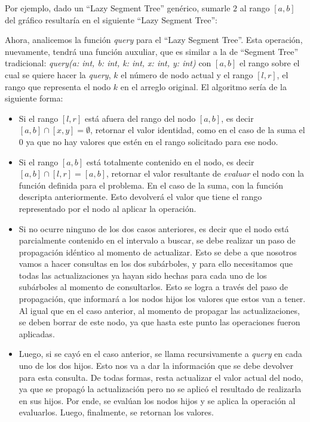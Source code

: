 \documentclass{article}
\begin{document}
Por ejemplo, dado un ``Lazy Segment Tree'' genérico, sumarle $2$ al rango $[a,b]$ del gráfico resultaría en el siguiente ``Lazy Segment Tree'':



Ahora, analicemos la función \textit{query} para el ``Lazy Segment Tree''. Esta operación, nuevamente, tendrá una función auxuliar, que es similar a la de ``Segment Tree'' tradicional: \textit{query(a: int, b: int, k: int, x: int, y: int)} con $[a,b]$ el rango sobre el cual se quiere hacer la \textit{query}, $k$ el número de nodo actual y el rango $[l,r]$, el rango que representa el nodo $k$ en el arreglo original. El algoritmo sería de la siguiente forma:

\begin{itemize}
    \item Si el rango $[l,r]$ está afuera del rango del nodo $[a,b]$, es decir $[a,b]\cap[x,y] = \emptyset$, retornar el valor identidad, como en el caso de la suma el $0$ ya que no hay valores que estén en el rango solicitado para ese nodo.
    \item Si el rango $[a,b]$ está totalmente contenido en el nodo, es decir $[a,b]\cap[l,r] = [a, b]$, retornar el valor resultante de \textit{evaluar} el nodo con la función definida para el problema. En el caso de la suma, con la función descripta anteriormente. Esto devolverá el valor que tiene el rango representado por el nodo al aplicar la operación.
    \item Si no ocurre ninguno de los dos casos anteriores, es decir que el nodo está parcialmente contenido en el intervalo a buscar, se debe realizar un paso de propagación idéntico al momento de actualizar. Esto se debe a que nosotros vamos a hacer consultas en los dos subárboles, y para ello necesitamos que todas las actualizaciones ya hayan sido hechas para cada uno de los subárboles al momento de consultarlos. Esto se logra a través del paso de propagación, que informará a los nodos hijos los valores que estos van a tener. Al igual que en el caso anterior, al momento de propagar las actualizaciones, se deben borrar de este nodo, ya que hasta este punto las operaciones fueron aplicadas.
    \item Luego, si se cayó en el caso anterior, se llama recursivamente a \textit{query} en cada uno de los dos hijos. Esto nos va a dar la información que se debe devolver para esta consulta. De todas formas, resta actualizar el valor actual del nodo, ya que se propagó la actualización pero no se aplicó el resultado de realizarla en sus hijos. Por ende, se evalúan los nodos hijos y se aplica la operación al evaluarlos. Luego, finalmente, se retornan los valores.
\end{itemize}
\end{document}
